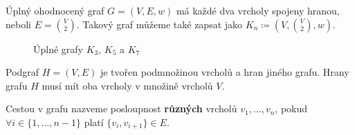 \begin{definition}
    \label{definice:uplny_ohodnoceny_graf}
    Úplný ohodnocený graf $G = (V, E, w)$ má kaž\-dé dva vrcholy spojeny hranou, neboli $E = \binom{V}{2}$. Takový graf můžeme také zapsat jako $K_n \coloneqq (V,\binom{V}{2},w)$.
    \begin{figure}[h]
        \centering
        \begin{subfigure}[b]{0.3\textwidth}
            \centering
        \end{subfigure}
        \begin{subfigure}[b]{0.3\textwidth}
            \centering
        \end{subfigure}
        \begin{subfigure}[b]{0.3\textwidth}
            \centering
        \end{subfigure}
        \caption{Úplné grafy $K_3$, $K_5$ a $K_7$}
        \label{obr:uplne_ohodnocene_grafy}

    \end{figure}
\end{definition}

\begin{definition}[Podgraf]
    Podgraf $H = (V, E)$ je tvořen podmnožinou vrcholů a hran jiného grafu. Hrany grafu $H$ musí mít oba vrcholy v množině vrcholů $V$.
    
\end{definition}

\begin{definition}[Cesta]
    \label{definice:cesta}
    Cestou v grafu nazveme posloupnost \textbf{různých} vrcholů $v_1, \ldots, v_n$, pokud $\forall i \in \{1,\ldots, n-1\}$ platí $\{v_i, v_{i+1}\} \in E$.  
\end{definition}

